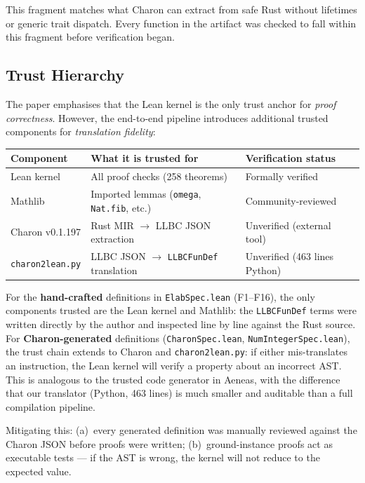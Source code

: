 \noindent
This fragment matches what Charon can extract from safe Rust without
lifetimes or generic trait dispatch. Every function in the artifact
was checked to fall within this fragment before verification began.

\subsection{Trust Hierarchy}
\label{sec:tch}

The paper emphasises that the Lean kernel is the only trust anchor for
\emph{proof correctness}. However, the end-to-end pipeline introduces
additional trusted components for \emph{translation fidelity}:

\begin{center}
\small
\begin{tabular}{@{}lll@{}}
\toprule
\textbf{Component}    & \textbf{What it is trusted for} & \textbf{Verification status} \\
\midrule
Lean kernel           & All proof checks (258 theorems) & Formally verified \\
Mathlib               & Imported lemmas (\texttt{omega}, \texttt{Nat.fib}, etc.) & Community-reviewed \\
\midrule
Charon v0.1.197       & Rust MIR $\to$ LLBC JSON extraction & Unverified (external tool) \\
\texttt{charon2lean.py} & LLBC JSON $\to$ \texttt{LLBCFunDef} translation & Unverified (463 lines Python) \\
\bottomrule
\end{tabular}
\end{center}

\noindent
For the \textbf{hand-crafted} definitions in \texttt{ElabSpec.lean}
(F1--F16), the only components trusted are the Lean kernel and Mathlib:
the \texttt{LLBCFunDef} terms were written directly by the author and
inspected line by line against the Rust source. For \textbf{Charon-generated}
definitions (\texttt{CharonSpec.lean}, \texttt{NumIntegerSpec.lean}), the
trust chain extends to Charon and \texttt{charon2lean.py}: if either
mis-translates an instruction, the Lean kernel will verify a property about
an incorrect AST. This is analogous to the trusted code generator in Aeneas,
with the difference that our translator (Python, 463 lines) is much smaller
and auditable than a full compilation pipeline.

Mitigating this: (a)~every generated definition was manually reviewed against
the Charon JSON before proofs were written; (b)~ground-instance \rfl proofs
act as executable tests — if the AST is wrong, the kernel will not reduce to
the expected value.

